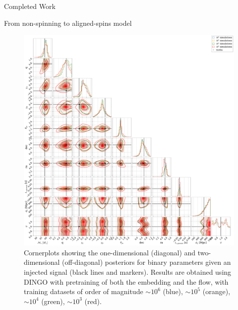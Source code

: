 \documentclass[a4paper, 12pt, twoside, openright, titlepage]{book}
\begin{document}
\begin{chapter}{Completed Work}
\begin{section}{From non-spinning to aligned-spins model}
\begin{figure}
\includegraphics[width=1.1\columnwidth]{figures/cornerplots.pdf}
\caption{Cornerplots showing the one-dimensional (diagonal) and two-dimensional (off-diagonal) posteriors for binary parameters given an injected signal (black lines and markers). Results are obtained using DINGO with pretraining of both the embedding and the flow, with training datasets of order of magnitude $\sim10^{6}$ (blue), $\sim10^{5}$ (orange), $\sim10^{4}$ (green), $\sim10^{3}$ (red).}
\label{cp}
\end{figure}


\end{section}
\end{chapter}
\end{document}
